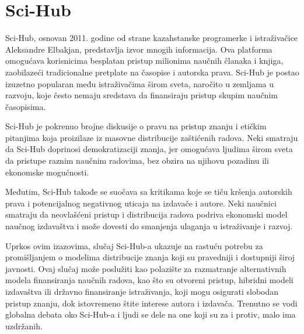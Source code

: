 \documentclass[a4paper]{article}
\begin{document}
{\setlength{\parskip}{1em}


\section{Sci-Hub}	
\label{sec:sci-hub}

Sci-Hub, osnovan 2011. godine od strane kazahstanske programerke i istraživačice Aleksandre Elbakjan, predstavlja izvor mnogih informacija. Ova platforma omogućava korisnicima besplatan pristup milionima naučnih članaka i knjiga, zaobilazeći tradicionalne pretplate na časopise i autorska prava. \cite{treca} Sci-Hub je postao izuzetno popularan među istraživačima širom sveta, naročito u zemljama u razvoju, koje često nemaju sredstava da finansiraju pristup skupim naučnim časopisima.


Sci-Hub je pokrenuo brojne diskusije o pravu na pristup znanju i etičkim pitanjima koja proizilaze iz masovne distribucije zaštićenih radova. Neki smatraju da Sci-Hub doprinosi demokratizaciji znanja, jer omogućava ljudima širom sveta da pristupe raznim naučnim radovima, bez obzira na njihovu pozadinu ili ekonomske mogućnosti.

Međutim, Sci-Hub takođe se suočava sa kritikama koje se tiču kršenja autorskih prava i potencijalnog negativnog uticaja na izdavače i autore.\cite{druga} Neki naučnici smatraju da neovlašćeni pristup i distribucija radova podriva ekonomski model naučnog izdavaštva i može dovesti do smanjenja ulaganja u istraživanje i razvoj.


Uprkos ovim izazovima, slučaj Sci-Hub-a ukazuje na rastuću potrebu za promišljanjem o modelima distribucije znanja koji su pravedniji i dostupniji široj javnosti. \cite{cetvrta} Ovaj slučaj može poslužiti kao polazište za razmatranje alternativnih modela finansiranja naučnih radova, kao što su otvoreni pristup, hibridni modeli izdavaštva ili državno finansiranje istraživanja, koji mogu osigurati slobodan pristup znanju, dok istovremeno štite interese autora i izdavača. Trenutno se vodi globalna debata oko Sci-Hub-a i ljudi se dele na one koji su za i protiv, malo ima uzdržanih.



\setlength{\parskip}{2em}


\begin{verbatim}

\end{verbatim}

}
\end{document}
